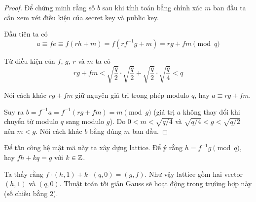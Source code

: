 \begin{proof}
    Để chứng minh rằng số $b$ sau khi tính toán bằng chính xác $m$ ban đầu ta cần xem xét điều kiện của secret key và public key.

    Đầu tiên ta có \[ a \equiv fe \equiv f(rh + m) = f(r f^{-1} g + m) = rg + fm \pmod q \]

    Từ điều kiện của $f$, $g$, $r$ và $m$ ta có \[ rg + fm < \sqrt{\dfrac{q}{2}} \cdot \sqrt{\dfrac{q}{2}} + \sqrt{\dfrac{q}{2}} \cdot \sqrt{\dfrac{q}{4}} < q \]

    Nói cách khác $rg + fm$ giữ nguyên giá trị trong phép modulo $q$, hay $a \equiv rg + fm$.

    Suy ra $b = f^{-1} a = f^{-1} (rg + fm) = m \pmod g$ (giá trị $a$ không thay đổi khi chuyển từ modulo $q$ sang modulo $g$). Do $0 < m < \sqrt{q/4}$ và $\sqrt{q/4} < g < \sqrt{q/2}$ nên $m < g$. Nói cách khác $b$ bằng đúng $m$ ban đầu.
\end{proof}

Để tấn công hệ mật mã này ta xây dựng lattice. Để ý rằng $h = f^{-1} g \pmod q$, hay $fh + kq = g$ với $k \in \mathbb{Z}$.

Ta thấy rằng $f \cdot (h, 1) + k \cdot (q, 0) = (g, f)$. Như vậy lattice gồm hai vector $(h, 1)$ và $(q, 0)$. Thuật toán tối giản Gauss sẽ hoạt động trong trường hợp này (số chiều bằng 2).
